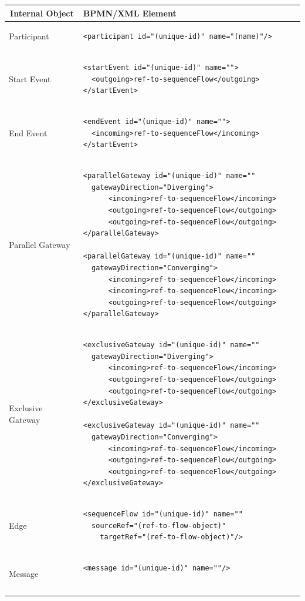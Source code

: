 \begin{table}[H]
\centering
\begin{tabular}{l|l}
\multicolumn{1}{c|}{\textbf{Internal Object}} & \multicolumn{1}{l}{\textbf{BPMN/XML Element}}     \\ \hline
Participant &
\begin{lstlisting}
<participant id="(unique-id)" name="(name)"/>       
\end{lstlisting}\\ \hline
Start Event &
\begin{lstlisting}
<startEvent id="(unique-id)" name="">
  <outgoing>ref-to-sequenceFlow</outgoing>
</startEvent>       
\end{lstlisting} \\ \hline
End Event &
\begin{lstlisting}
<endEvent id="(unique-id)" name="">
  <incoming>ref-to-sequenceFlow</incoming>
</startEvent>       
\end{lstlisting} \\ \hline
Parallel Gateway &
\begin{lstlisting}
<parallelGateway id="(unique-id)" name="" 
  gatewayDirection="Diverging">
      <incoming>ref-to-sequenceFlow</incoming>
      <outgoing>ref-to-sequenceFlow</outgoing>
      <outgoing>ref-to-sequenceFlow</outgoing>
</parallelGateway>

<parallelGateway id="(unique-id)" name="" 
  gatewayDirection="Converging">
      <incoming>ref-to-sequenceFlow</incoming>
      <incoming>ref-to-sequenceFlow</incoming>
      <outgoing>ref-to-sequenceFlow</outgoing>
</parallelGateway>      
\end{lstlisting} \\ \hline
Exclusive Gateway &
\begin{lstlisting}
<exclusiveGateway id="(unique-id)" name="" 
  gatewayDirection="Diverging">
      <incoming>ref-to-sequenceFlow</incoming>
      <outgoing>ref-to-sequenceFlow</outgoing>
      <outgoing>ref-to-sequenceFlow</outgoing>
</exclusiveGateway>

<exclusiveGateway id="(unique-id)" name="" 
  gatewayDirection="Converging">
      <incoming>ref-to-sequenceFlow</incoming>
      <outgoing>ref-to-sequenceFlow</outgoing>
      <outgoing>ref-to-sequenceFlow</outgoing>
</exclusiveGateway>       
\end{lstlisting} \\ \hline
Edge & 
\begin{lstlisting}
<sequenceFlow id="(unique-id)" name="" 
  sourceRef="(ref-to-flow-object)" 
    targetRef="(ref-to-flow-object)"/>          
\end{lstlisting} \\ \hline
Message & 
\begin{lstlisting}
<message id="(unique-id)" name=""/>


\end{lstlisting}
\end{tabular}
\end{table}

